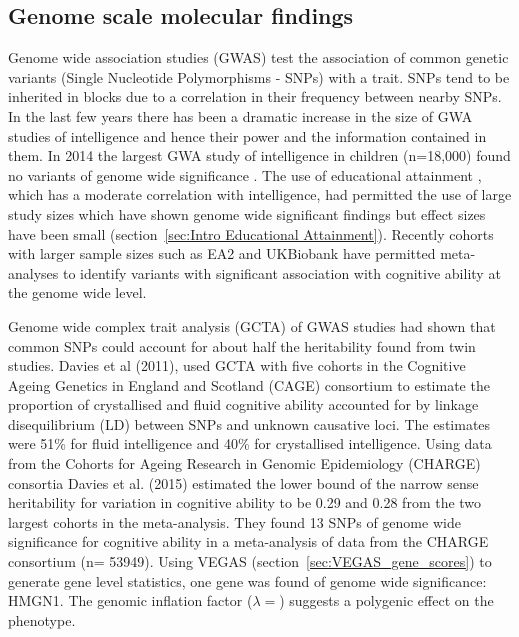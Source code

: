 \subsection{Genome scale molecular findings}

Genome wide association studies (GWAS) test the association of common genetic variants (Single Nucleotide Polymorphisms - SNPs) with a trait. SNPs tend to be inherited in blocks due to a correlation in their frequency between nearby SNPs. 
In the last few years there has been a dramatic increase in the size of GWA studies of intelligence and hence their power and the information contained in them. In 2014 the largest GWA study of intelligence in children (n=18,000) found no variants of genome wide significance 
\cite{benyamin2014childhood}.
The use of educational attainment , which has a moderate correlation with intelligence, had permitted the use of large study sizes which have shown genome wide significant findings but effect sizes have been small (section~\ref{sec:Intro Educational Attainment}). Recently cohorts with larger sample sizes such as EA2 \cite{okbay2016genome} and UKBiobank\cite{hill2019combined} have permitted meta-analyses to identify variants with significant association with cognitive ability at the genome wide level. 

Genome wide complex trait analysis (GCTA)
\cite{yang2011gcta} of GWAS studies had shown that common SNPs could account for about half the heritability found from twin studies. Davies et al (2011)\cite{davies2011genome}, used GCTA with five cohorts in the Cognitive Ageing Genetics in England and Scotland (CAGE) consortium to estimate the proportion of crystallised and fluid cognitive ability accounted for by linkage disequilibrium (LD) between SNPs and unknown causative loci. The estimates were 51\% for fluid intelligence and 40\% for crystallised intelligence.
Using data from the Cohorts for Ageing Research in Genomic Epidemiology %
(CHARGE) consortia %
\cite{psaty2009cohorts} Davies et al. (2015)\cite{davies2015genetic} estimated the lower bound of the narrow sense heritability for variation in cognitive ability to be 0.29 and 0.28 from the two largest cohorts in the meta-analysis. They found 13 SNPs of genome wide significance for cognitive ability in a meta-analysis of data from the CHARGE consortium (n= 53949). Using VEGAS (section~\ref{sec:VEGAS_gene_scores}) to generate gene level statistics, one gene was found of genome wide significance: HMGN1. The genomic inflation factor ($\lambda=$) suggests a polygenic effect on the phenotype.

